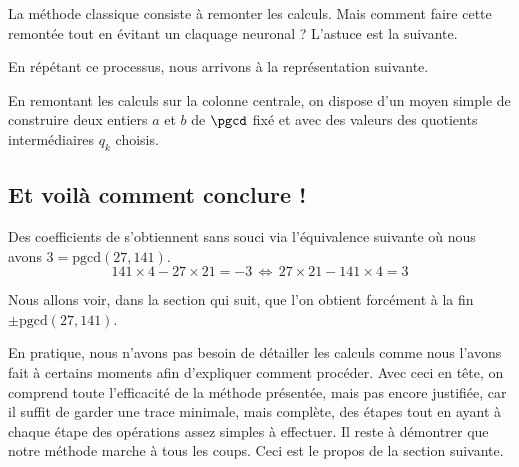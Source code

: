 La méthode classique consiste à remonter les calculs. Mais comment faire cette remontée tout en évitant un claquage neuronal ? L'astuce est la suivante.

\vfill\newpage

\begin{multicols}{2}

	\columnbreak
	
\end{multicols}




\medskip


\vfill\newpage

En répétant ce processus, nous arrivons à la représentation suivante.



\begin{remark}
	En remontant les calculs sur la colonne centrale, on dispose d'un moyen simple de construire deux entiers $a$ et $b$ de $\pgcd$ fixé et avec des valeurs des quotients intermédiaires $q_k$ choisis.
\end{remark}




\subsection{Et voilà comment conclure !}



\medskip


Des coefficients de \bb{} s'obtiennent sans souci via l'équivalence suivante où nous avons $3 = \mathrm{pgcd}(27 , 141)$.
\[141 \times 4 - 27 \times 21 = -3 \,\Longleftrightarrow\, 27 \times 21 - 141 \times 4 = 3\]


\medskip


Nous allons voir, dans la section qui suit, que l'on obtient forcément à la fin $\pm \mathrm{pgcd}(27 , 141)$. 


\medskip


En pratique, nous n'avons pas besoin de détailler les calculs comme nous l'avons fait à certains moments afin d'expliquer comment procéder.
Avec ceci en tête, on comprend toute l'efficacité de la méthode présentée, mais pas encore justifiée, car il suffit de garder une trace minimale, mais complète, des étapes tout en ayant à chaque étape des opérations assez simples à effectuer.
Il reste à démontrer que notre méthode marche à tous les coups. Ceci est le propos de la section suivante.
	